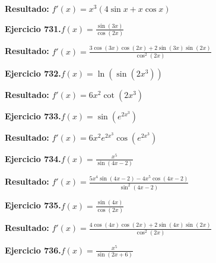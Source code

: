 \documentclass[10pt,a4paper]{article}
\begin{document}
\begin{solbox}
\textbf{Resultado:} \(\displaystyle f'(x) = x^{3}(4\sin x + x\cos x)\)
\end{solbox}

\begin{ejbox}
\textbf{Ejercicio 731.}\quad $f(x) = \frac{\sin(3x)}{\cos(2x)}$
\end{ejbox}

\begin{solbox}
\textbf{Resultado:} \(\displaystyle f'(x) = \frac{3\cos(3x)\cos(2x) + 2\sin(3x)\sin(2x)}{\cos^2(2x)}\)
\end{solbox}

\begin{ejbox}
\textbf{Ejercicio 732.}\quad $f(x) = \ln(\sin(2x^{3}))$
\end{ejbox}

\begin{solbox}
\textbf{Resultado:} \(\displaystyle f'(x) = 6x^{2}\cot(2x^{3})\)
\end{solbox}

\newpage
\begin{ejbox}
\textbf{Ejercicio 733.}\quad $f(x) = \sin(e^{2x^{3}})$
\end{ejbox}

\begin{solbox}
\textbf{Resultado:} \(\displaystyle f'(x) = 6x^{2}e^{2x^{3}}\cos(e^{2x^{3}})\)
\end{solbox}

\begin{ejbox}
\textbf{Ejercicio 734.}\quad $f(x) = \frac{x^{5}}{\sin(4x -2)}$
\end{ejbox}

\begin{solbox}
\textbf{Resultado:} \(\displaystyle f'(x) = \frac{5x^{4}\sin(4x -2) - 4x^{5}\cos(4x -2)}{\sin^2(4x -2)}\)
\end{solbox}

\begin{ejbox}
\textbf{Ejercicio 735.}\quad $f(x) = \frac{\sin(4x)}{\cos(2x)}$
\end{ejbox}

\begin{solbox}
\textbf{Resultado:} \(\displaystyle f'(x) = \frac{4\cos(4x)\cos(2x) + 2\sin(4x)\sin(2x)}{\cos^2(2x)}\)
\end{solbox}

\newpage
\begin{ejbox}
\textbf{Ejercicio 736.}\quad $f(x) = \frac{x^{5}}{\sin(2x +6)}$
\end{ejbox}
\end{document}
